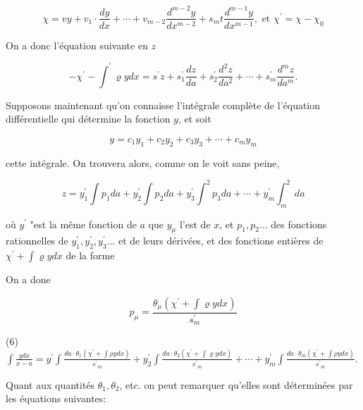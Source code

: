 \documentclass{article}
\begin{document}
\[
\chi=v y+v_{1} \cdot \frac{d y}{d x}+\cdots+v_{m-2} \frac{d^{m-2} y}{d x^{m-2}}+s_{m} t \frac{d^{m-1} y}{d x^{m-1}}, \text { et } \chi^{\prime}=\chi-\chi_{0}
\]

On a donc l'équation suivante en \(z\)

\[
-\chi^{\prime}-\int^{\prime} \varrho y d x=s^{\prime} z+s_{1}^{\prime} \frac{d z}{d a}+s_{2}^{\prime} \frac{d^{2} z}{d a^{2}}+\cdots+s_{m}^{\prime} \frac{d^{m} z}{d a^{m}} .
\]

Supposons maintenant qu'on connaisse l'intégrale complète de l'équation différentielle qui détermine la fonction \(y\), et soit

\[
y=c_{1} y_{1}+c_{2} y_{2}+c_{3} y_{3}+\cdots+c_{m} y_{m}
\]

cette intégrale. On trouvera alors, comme on le voit sans peine,

\[
z=y_{1}^{\prime} \int p_{1} d a+y_{2}^{\prime} \int p_{2} d a+y_{3}^{\prime} \int^{2} p_{3} d a+\cdots+y_{m}^{\prime} \int_{m}^{2} d a
\]

où \(y^{\prime}\) "est la même fonction de \(a\) que \(y_{\mu}\) l'est de \(x\), et \(p_{1}, p_{2} \ldots\) des fonctions rationnelles de \(y_{1}^{\prime}, y_{2}^{\prime}, y_{3}^{\prime} \ldots\) et de leurs dérivées, et des fonctions entières de \(\chi^{\prime}+\int \varrho y d x\) de la forme

On a done

\[
p_{\mu}=\frac{\theta_{\mu}\left(\chi^{\prime}+\int \varrho y d x\right)}{s_{m}^{\prime}}
\]

(6) \(\int \frac{y d x}{x-a}=y^{\prime} \int \frac{d a \cdot \theta_{1}\left(\chi^{\prime}+\int \rho y d x\right)}{s^{\prime}{ }_{m}}+y_{2}^{\prime} \int \frac{d a \cdot \theta_{2}\left(\chi^{\prime}+\int \varrho y d x\right)}{s^{\prime}{ }_{m}}+\cdots+y_{m}^{\prime} \int \frac{d a \cdot \theta_{m}\left(\chi^{\prime}+\int \rho y d x\right)}{s^{\prime}{ }_{m}}\).

Quant aux quantités \(\theta_{1}, \theta_{2}\), etc. on peut remarquer qu'elles sont déterminées par les équations suivantes:
\end{document}
